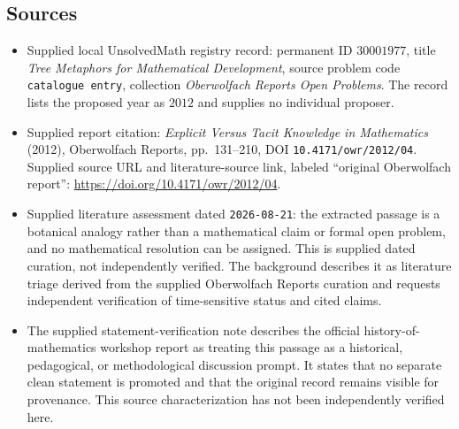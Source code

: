 \documentclass[11pt]{article}
\begin{document}
\subsection{Sources}
\begin{itemize}
\item Supplied local UnsolvedMath registry record: permanent ID \(30001977\), title \emph{Tree Metaphors for Mathematical Development}, source problem code \texttt{catalogue entry}, collection \emph{Oberwolfach Reports Open Problems}. The record lists the proposed year as \(2012\) and supplies no individual proposer.
\item Supplied report citation: \emph{Explicit Versus Tacit Knowledge in Mathematics} (2012), Oberwolfach Reports, pp.\ 131--210, DOI \texttt{10.4171/owr/2012/04}. Supplied source URL and literature-source link, labeled ``original Oberwolfach report'': \url{https://doi.org/10.4171/owr/2012/04}.
\item Supplied literature assessment dated \texttt{2026-08-21}: the extracted passage is a botanical analogy rather than a mathematical claim or formal open problem, and no mathematical resolution can be assigned. This is supplied dated curation, not independently verified. The background describes it as literature triage derived from the supplied Oberwolfach Reports curation and requests independent verification of time-sensitive status and cited claims.
\item The supplied statement-verification note describes the official history-of-mathematics workshop report as treating this passage as a historical, pedagogical, or methodological discussion prompt. It states that no separate clean statement is promoted and that the original record remains visible for provenance. This source characterization has not been independently verified here.
\end{itemize}
\end{document}
